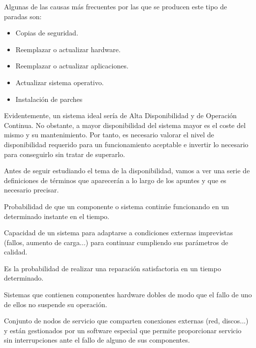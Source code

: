 \begin{enumerate}
Algunas de las causas más frecuentes por las que se producen este tipo de paradas son:

\begin{itemize}
\item Copias de seguridad.
\item Reemplazar o actualizar hardware.
\item Reemplazar o actualizar aplicaciones.
\item Actualizar sistema operativo.
\item Instalación de parches
\end{itemize}
\end{enumerate}

Evidentemente, un sistema ideal sería de Alta Disponibilidad y de Operación Continua. No obstante, a mayor disponibilidad del sistema mayor es el coste del mismo y su mantenimiento. Por tanto, es necesario valorar el nivel de disponibilidad requerido para un funcionamiento aceptable e invertir lo necesario para conseguirlo sin tratar de superarlo.

Antes de seguir estudiando el tema de la disponibilidad, vamos a ver una serie de definiciones de términos que aparecerán a lo largo de los apuntes y que es necesario precisar.

\begin{defn}
Probabilidad de que un componente o sistema continúe funcionando en un determinado instante en el tiempo.
\end{defn}

\begin{defn}
Capacidad de un sistema para adaptarse a
condiciones externas imprevistas (fallos, aumento de carga...) para continuar cumpliendo sus parámetros de calidad.
\end{defn}

\begin{defn}
Es la probabilidad de realizar una reparación satisfactoria en un tiempo determinado.
\end{defn}

\begin{defn}\label{cluster:FT}
Sistemas que contienen
componentes hardware dobles de modo que el fallo de uno de ellos no suspende su
operación.
\end{defn}
\newpage
\begin{defn}
Conjunto de nodos de servicio que comparten conexiones externas (red, discos...) y están gestionados por un software especial que permite proporcionar servicio sin interrupciones ante el fallo de alguno de sus componentes.
\end{defn}

